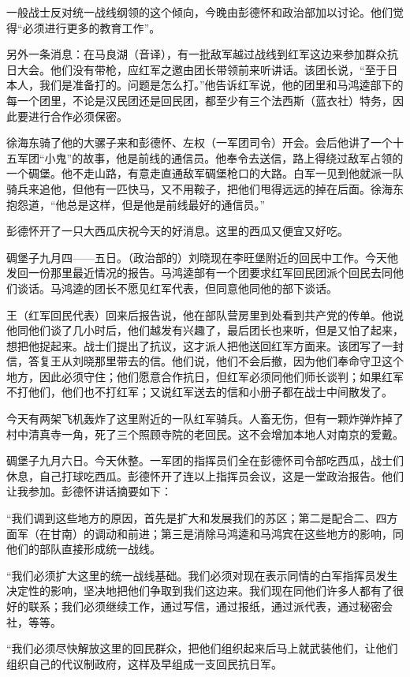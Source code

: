 \documentclass[10pt]{book}
\begin{document}
一般战士反对统一战线纲领的这个倾向，今晚由彭德怀和政治部加以讨论。他们觉得“必须进行更多的教育工作”。

另外一条消息：在马良湖（音译），有一批敌军越过战线到红军这边来参加群众抗日大会。他们没有带枪，应红军之邀由团长带领前来听讲话。该团长说，“至于日本人，我们是准备打的。问题是怎么打。”他告诉红军说，他的团里和马鸿逵部下的每一个团里，不论是汉民团还是回民团，都至少有三个法西斯（蓝衣社）特务，因此要进行合作必须保密。

徐海东骑了他的大骡子来和彭德怀、左权（一军团司令）开会。会后他讲了一个十五军团“小鬼”的故事，他是前线的通信员。他奉令去送信，路上得绕过敌军占领的一个碉堡。他不走山路，有意走直通敌军碉堡枪口的大路。白军一见到他就派一队骑兵来追他，但他有一匹快马，又不用鞍子，把他们甩得远远的掉在后面。徐海东抱怨道，“他总是这样，但是他是前线最好的通信员。”

彭德怀开了一只大西瓜庆祝今天的好消息。这里的西瓜又便宜又好吃。

碉堡子九月四——五日。（政治部的）刘晓现在李旺堡附近的回民中工作。今天他发回一份那里最近情况的报告。马鸿逵部有一个团要求红军回民团派个回民去同他们谈话。马鸿逵的团长不愿见红军代表，但同意他同他的部下谈话。

王（红军回民代表）回来后报告说，他在部队营房里到处看到共产党的传单。他说他同他们谈了几小时后，他们越发有兴趣了，最后团长也来听，但是又怕了起来，想把他捉起来。战士们提出了抗议，这才派人把他送回红军方面来。该团写了一封信，答复王从刘晓那里带去的信。他们说，他们不会后撤，因为他们奉命守卫这个地方，因此必须守住；他们愿意合作抗日，但红军必须同他们师长谈判；如果红军不打他们，他们也不打红军；又说红军送去的信和小册子都在战士中间散发了。

今天有两架飞机轰炸了这里附近的一队红军骑兵。人畜无伤，但有一颗炸弹炸掉了村中清真寺一角，死了三个照顾寺院的老回民。这不会增加本地人对南京的爱戴。

碉堡子九月六日。今天休整。一军团的指挥员们全在彭德怀司令部吃西瓜，战士们休息，自己打球吃西瓜。彭德怀开了连以上指挥员会议，这是一堂政治报告。他们让我参加。彭德怀讲话摘要如下：

“我们调到这些地方的原因，首先是扩大和发展我们的苏区；第二是配合二、四方面军（在甘南）的调动和前进；第三是消除马鸿逵和马鸿宾在这些地方的影响，同他们的部队直接形成统一战线。

“我们必须扩大这里的统一战线基础。我们必须对现在表示同情的白军指挥员发生决定性的影响，坚决地把他们争取到我们这边来。我们现在同他们许多人都有了很好的联系；我们必须继续工作，通过写信，通过报纸，通过派代表，通过秘密会社，等等。

“我们必须尽快解放这里的回民群众，把他们组织起来后马上就武装他们，让他们组织自己的代议制政府，这样及早组成一支回民抗日军。
\end{document}
